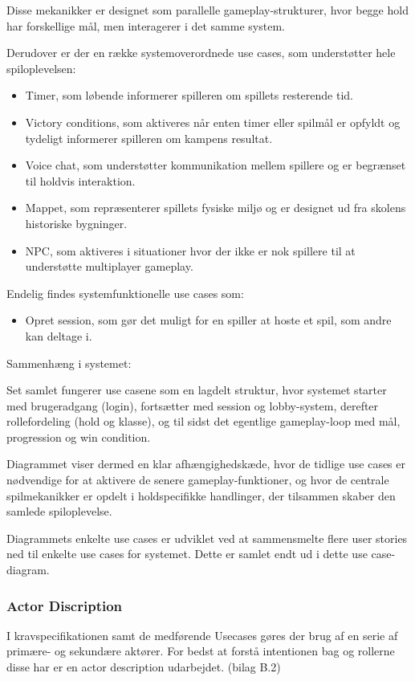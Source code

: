 Disse mekanikker er designet som parallelle gameplay-strukturer, hvor begge hold har forskellige mål, men interagerer i det samme system.

Derudover er der en række systemoverordnede use cases, som understøtter hele spiloplevelsen:

\begin{itemize}
    \item Timer, som løbende informerer spilleren om spillets resterende tid.
    \item Victory conditions, som aktiveres når enten timer eller spilmål er opfyldt og tydeligt informerer spilleren om kampens resultat.
    \item Voice chat, som understøtter kommunikation mellem spillere og er begrænset til holdvis interaktion.
    \item Mappet, som repræsenterer spillets fysiske miljø og er designet ud fra skolens historiske bygninger.
    \item NPC, som aktiveres i situationer hvor der ikke er nok spillere til at understøtte multiplayer gameplay.
\end{itemize}

Endelig findes systemfunktionelle use cases som:

\begin{itemize}
    \item Opret session, som gør det muligt for en spiller at hoste et spil, som andre kan deltage i.
\end{itemize} 
Sammenhæng i systemet:

Set samlet fungerer use casene som en lagdelt struktur, hvor systemet starter med brugeradgang (login), fortsætter med session og lobby-system, derefter rollefordeling (hold og klasse), og til sidst det egentlige gameplay-loop med mål, progression og win condition.

Diagrammet viser dermed en klar afhængighedskæde, hvor de tidlige use cases er nødvendige for at aktivere de senere gameplay-funktioner, og hvor de centrale spilmekanikker er opdelt i holdspecifikke handlinger, der tilsammen skaber den samlede spiloplevelse.

Diagrammets enkelte use cases er udviklet ved at sammensmelte flere user stories ned til enkelte use cases for systemet. Dette er samlet endt ud i dette use case-diagram.

\subsubsection{Actor Discription}
I kravspecifikationen samt de medførende Usecases gøres der brug af en serie af primære- og sekundære aktører. For bedst at forstå intentionen bag og rollerne disse har er en actor description udarbejdet. (bilag B.2) 

